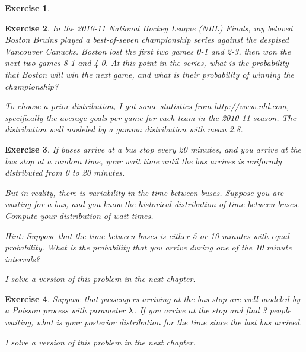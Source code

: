 \documentclass[12pt]{book}
\theoremstyle{exercise}
\newtheorem{exercise}{Exercise}[chapter]
\begin{document}
\begin{exercise}
\end{exercise}



\begin{exercise}
In the 2010-11 National Hockey League (NHL) Finals, my beloved Boston
Bruins played a best-of-seven championship series against the despised
Vancouver Canucks.  Boston lost the first two games 0-1 and 2-3, then
won the next two games 8-1 and 4-0.  At this point in the series, what
is the probability that Boston will win the next game, and what is
their probability of winning the championship?

To choose a prior distribution, I got some statistics from
\url{http://www.nhl.com}, specifically the average goals per game
for each team in the 2010-11 season.  The distribution well modeled by a gamma distribution with mean 2.8.
\end{exercise}





\begin{exercise}

If buses arrive at a bus stop every 20 minutes, and you
arrive at the bus stop at a random time, your wait time until
the bus arrives is uniformly distributed from 0 to 20 minutes.

But in reality, there is variability in the time between
buses.  Suppose you are waiting for a bus, and you know the historical
distribution of time between buses.  Compute your distribution
of wait times.

Hint: Suppose that the time between buses is either
5 or 10 minutes with equal probability.  What is the probability
that you arrive during one of the 10 minute intervals?

I solve a version of this problem in the next chapter.

\end{exercise}


\begin{exercise}

Suppose that passengers arriving at the bus stop are well-modeled
by a Poisson process with parameter $\mathtt{\lambda}$.  If you arrive at the
stop and find 3 people waiting, what is your posterior distribution
for the time since the last bus arrived.

I solve a version of this problem in the next chapter.

\end{exercise}
\end{document}
